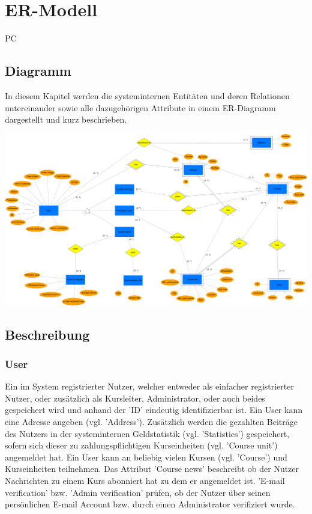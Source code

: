 \chapter{ER-Modell}

\begin{tiny}
PC
\end{tiny}

\section{Diagramm}

In diesem Kapitel werden die systeminternen Entitäten und deren Relationen untereinander sowie alle dazugehörigen Attribute in einem ER-Diagramm dargestellt und kurz beschrieben.

\includegraphics[scale=0.085]{./Grafiken/ER-Diagramm.pdf}

\section{Beschreibung}
\subsection{User}
Ein im System registrierter Nutzer, welcher entweder als einfacher registrierter Nutzer, oder zusätzlich als Kursleiter, Administrator, oder auch beides gespeichert wird und anhand der 'ID' eindeutig identifizierbar ist. Ein User kann eine Adresse angeben (vgl. 'Address'). Zusätzlich werden die gezahlten Beiträge des Nutzers in der systeminternen Geldstatistik (vgl. 'Statistics') gespeichert, sofern sich dieser zu zahlungspflichtigen Kurseinheiten (vgl. 'Course unit') angemeldet hat. Ein User kann an beliebig vielen Kursen (vgl. 'Course') und Kurseinheiten teilnehmen. Das Attribut 'Course news' beschreibt ob der Nutzer Nachrichten zu einem Kurs abonniert hat zu dem er angemeldet ist. 'E-mail verification' bzw. 'Admin verification' prüfen, ob der Nutzer über seinen persönlichen E-mail Account bzw. durch einen Administrator verifiziert wurde.

